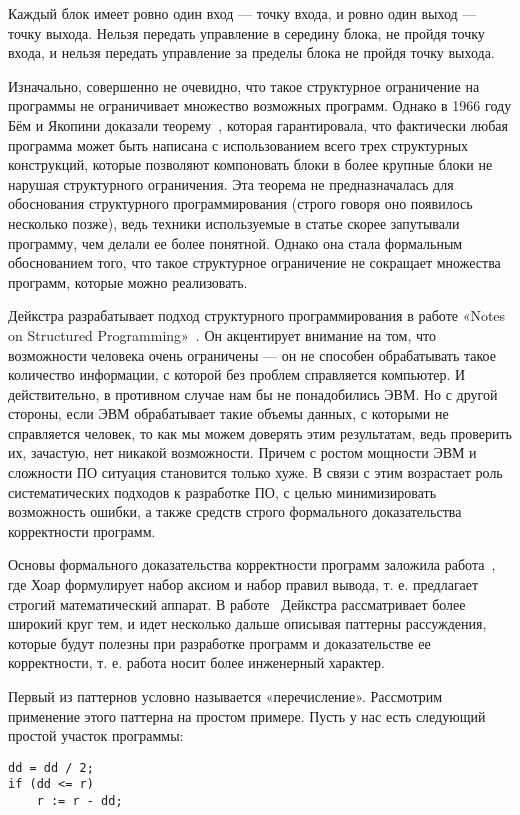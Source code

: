 Каждый блок имеет ровно один вход — точку входа, и ровно один выход — точку выхода. Нельзя передать управление в середину блока, не пройдя точку входа, и нельзя передать управление за пределы блока не пройдя точку выхода.

Изначально, совершенно не очевидно, что такое структурное ограничение на программы не ограничивает множество возможных программ. Однако в 1966 году Бём и Якопини доказали теорему~\cite{SPT}, которая гарантировала, что фактически любая программа может быть написана с использованием всего трех структурных конструкций, которые позволяют компоновать блоки в более крупные блоки не нарушая структурного ограничения. Эта теорема не предназначалась для обоснования структурного программирования (строго говоря оно появилось несколько позже), ведь техники используемые в статье скорее запутывали программу, чем делали ее более понятной. Однако она стала формальным обоснованием того, что такое структурное ограничение не сокращает множества программ, которые можно реализовать.

Дейкстра разрабатывает подход структурного программирования в работе «Notes on Structured Programming»~\cite{Dijkstra:1972:CIN}. Он акцентирует внимание на том, что возможности человека очень ограничены — он не способен обрабатывать такое количество информации, с которой без проблем справляется компьютер. И действительно, в противном случае нам бы не понадобились ЭВМ. Но с другой стороны, если ЭВМ обрабатывает такие объемы данных, с которыми не справляется человек, то как мы можем доверять этим результатам, ведь проверить их, зачастую, нет никакой возможности. Причем с ростом мощности ЭВМ и сложности ПО ситуация становится только хуже. В связи с этим возрастает роль систематических подходов к разработке ПО, с целью минимизировать возможность ошибки, а также средств строго формального доказательства корректности программ.

Основы формального доказательства корректности программ заложила работа~\cite{Hoare:1969:ABC}, где Хоар формулирует набор аксиом и набор правил вывода, т. е. предлагает строгий математический аппарат. В работе~\cite{Dijkstra:1972:CIN} Дейкстра рассматривает более широкий круг тем, и идет несколько дальше описывая паттерны рассуждения, которые будут полезны при разработке программ и доказательстве ее корректности, т. е. работа носит более инженерный характер.

Первый из паттернов условно называется «перечисление». Рассмотрим применение этого паттерна на простом примере. Пусть у нас есть следующий простой участок программы:
\begin{lstlisting}
dd = dd / 2;
if (dd <= r)
	r := r - dd;
\end{lstlisting}


